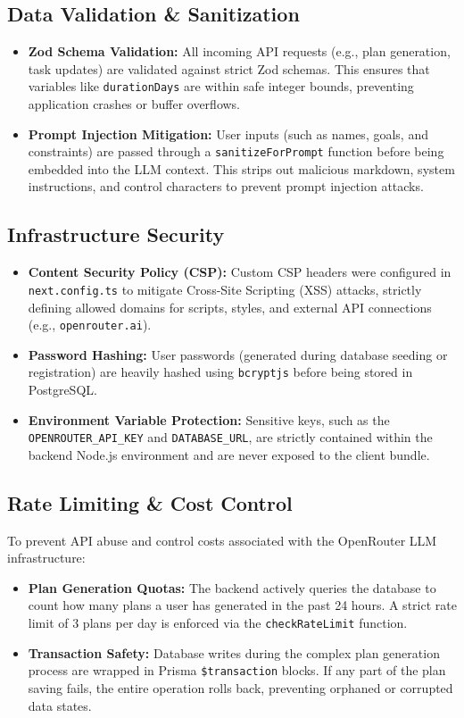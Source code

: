\documentclass[12pt,a4paper]{article}
\begin{document}
\subsection{Data Validation \& Sanitization}
\begin{itemize}
    \item \textbf{Zod Schema Validation:} All incoming API requests (e.g., plan generation, task updates) are validated against strict Zod schemas. This ensures that variables like \texttt{durationDays} are within safe integer bounds, preventing application crashes or buffer overflows.
    \item \textbf{Prompt Injection Mitigation:} User inputs (such as names, goals, and constraints) are passed through a \texttt{sanitizeForPrompt} function before being embedded into the LLM context. This strips out malicious markdown, system instructions, and control characters to prevent prompt injection attacks.
\end{itemize}

\subsection{Infrastructure Security}
\begin{itemize}
    \item \textbf{Content Security Policy (CSP):} Custom CSP headers were configured in \texttt{next.config.ts} to mitigate Cross-Site Scripting (XSS) attacks, strictly defining allowed domains for scripts, styles, and external API connections (e.g., \texttt{openrouter.ai}).
    \item \textbf{Password Hashing:} User passwords (generated during database seeding or registration) are heavily hashed using \texttt{bcryptjs} before being stored in PostgreSQL.
    \item \textbf{Environment Variable Protection:} Sensitive keys, such as the \texttt{OPENROUTER\_API\_KEY} and \texttt{DATABASE\_URL}, are strictly contained within the backend Node.js environment and are never exposed to the client bundle.
\end{itemize}

\subsection{Rate Limiting \& Cost Control}
To prevent API abuse and control costs associated with the OpenRouter LLM infrastructure:
\begin{itemize}
    \item \textbf{Plan Generation Quotas:} The backend actively queries the database to count how many plans a user has generated in the past 24 hours. A strict rate limit of 3 plans per day is enforced via the \texttt{checkRateLimit} function.
    \item \textbf{Transaction Safety:} Database writes during the complex plan generation process are wrapped in Prisma \texttt{\$transaction} blocks. If any part of the plan saving fails, the entire operation rolls back, preventing orphaned or corrupted data states.
\end{itemize}
\end{document}
